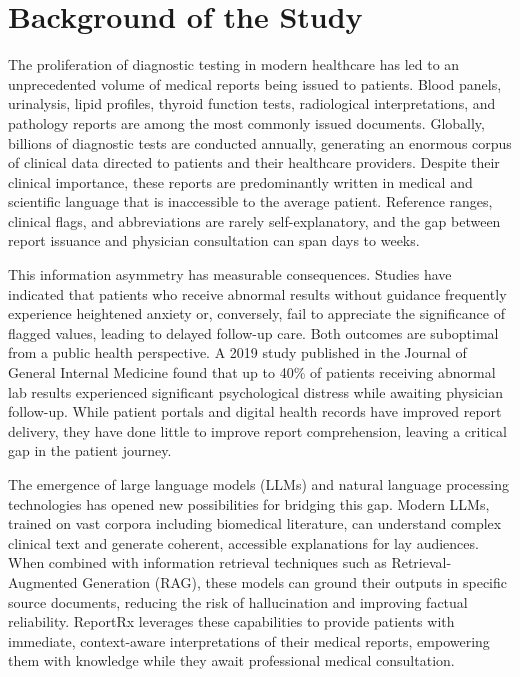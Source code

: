 \documentclass[12pt,a4paper]{report}
\begin{document}
\section{Background of the Study}
The proliferation of diagnostic testing in modern healthcare has led to an unprecedented volume of medical reports being issued to patients. Blood panels, urinalysis, lipid profiles, thyroid function tests, radiological interpretations, and pathology reports are among the most commonly issued documents. Globally, billions of diagnostic tests are conducted annually, generating an enormous corpus of clinical data directed to patients and their healthcare providers. Despite their clinical importance, these reports are predominantly written in medical and scientific language that is inaccessible to the average patient. Reference ranges, clinical flags, and abbreviations are rarely self-explanatory, and the gap between report issuance and physician consultation can span days to weeks.

This information asymmetry has measurable consequences. Studies have indicated that patients who receive abnormal results without guidance frequently experience heightened anxiety or, conversely, fail to appreciate the significance of flagged values, leading to delayed follow-up care. Both outcomes are suboptimal from a public health perspective. A 2019 study published in the Journal of General Internal Medicine found that up to 40\% of patients receiving abnormal lab results experienced significant psychological distress while awaiting physician follow-up. While patient portals and digital health records have improved report delivery, they have done little to improve report comprehension, leaving a critical gap in the patient journey.

The emergence of large language models (LLMs) and natural language processing technologies has opened new possibilities for bridging this gap. Modern LLMs, trained on vast corpora including biomedical literature, can understand complex clinical text and generate coherent, accessible explanations for lay audiences. When combined with information retrieval techniques such as Retrieval-Augmented Generation (RAG), these models can ground their outputs in specific source documents, reducing the risk of hallucination and improving factual reliability. ReportRx leverages these capabilities to provide patients with immediate, context-aware interpretations of their medical reports, empowering them with knowledge while they await professional medical consultation.
\end{document}
